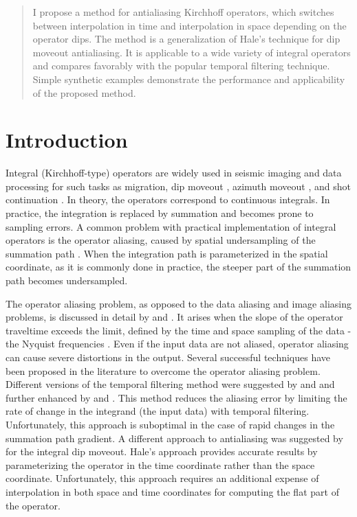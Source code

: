 
\begin{abstract}
I propose a method for antialiasing Kirchhoff operators, which
  switches between interpolation in time and interpolation in space
  depending on the operator dips. The method is a generalization of
  Hale's technique for dip moveout antialiasing. It is applicable to a
  wide variety of integral operators and compares favorably with the
  popular temporal filtering technique. Simple synthetic examples
  demonstrate the performance and applicability of the proposed
  method.
\end{abstract}

\section{Introduction}

Integral (Kirchhoff-type) operators are widely used in seismic imaging
and data processing for such tasks as migration, dip moveout
\cite[]{GEO56-06-07950805}, azimuth moveout \cite[]{GEO63-02-05740588},
and shot continuation \cite[]{GEO61-06-18461858}. In theory, the
operators correspond to continuous integrals. In practice, the
integration is replaced by summation and becomes prone to sampling
errors. A common problem with practical implementation of integral
operators is the operator aliasing, caused by spatial undersampling of
the summation path \cite[]{SEG-1994-1282}. When the integration path is
parameterized in the spatial coordinate, as it is commonly done in
practice, the steeper part of the summation path becomes undersampled.

The operator aliasing problem, as opposed to the data aliasing and
image aliasing problems, is discussed in detail by
\cite{SEG-1994-1282} and \cite{GEO66-02-06540666}. It arises when
the slope of the operator traveltime exceeds the limit, defined by the
time and space sampling of the data - the Nyquist frequencies
\cite[]{Claerbout.sep.73.371}. Even if the input data are not aliased,
operator aliasing can cause severe distortions in the output. Several
successful techniques have been proposed in the literature to overcome
the operator aliasing problem.  Different versions of the temporal
filtering method were suggested by \cite{GPR40-05-05650572} and
\cite{SEG-1994-1282} and further enhanced by \cite{GEO64-06-17831792}
and \cite{GEO66-02-06540666}. This method reduces the aliasing error
by limiting the rate of change in the integrand (the input data) with
temporal filtering. Unfortunately, this approach is suboptimal in the
case of rapid changes in the summation path gradient. A different
approach to antialiasing was suggested by \cite{GEO56-06-07950805} for
the integral dip moveout. Hale's approach provides accurate results by
parameterizing the operator in the time coordinate rather than the
space coordinate.  Unfortunately, this approach requires an additional
expense of interpolation in both space and time coordinates for
computing the flat part of the operator.

